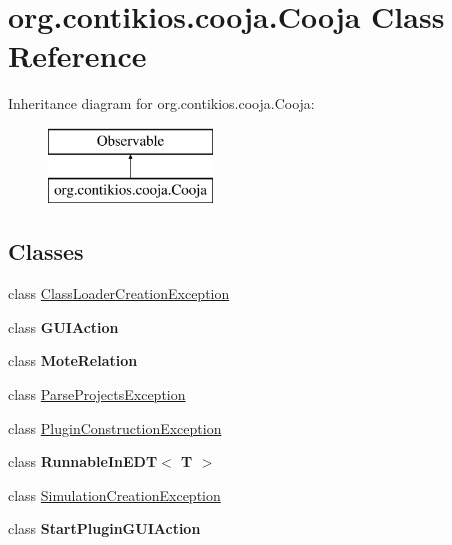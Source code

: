\hypertarget{classorg_1_1contikios_1_1cooja_1_1Cooja}{\section{org.\-contikios.\-cooja.\-Cooja Class Reference}
\label{classorg_1_1contikios_1_1cooja_1_1Cooja}
}
Inheritance diagram for org.\-contikios.\-cooja.\-Cooja\-:\begin{figure}[H]
\begin{center}
\leavevmode
\includegraphics[height=2.000000cm]{classorg_1_1contikios_1_1cooja_1_1Cooja}
\end{center}
\end{figure}
\subsection*{Classes}
\begin{DoxyCompactItemize}
\item 
class \hyperlink{classorg_1_1contikios_1_1cooja_1_1Cooja_1_1ClassLoaderCreationException}{Class\-Loader\-Creation\-Exception}
\item 
class {\bfseries G\-U\-I\-Action}
\item 
class {\bfseries Mote\-Relation}
\item 
class \hyperlink{classorg_1_1contikios_1_1cooja_1_1Cooja_1_1ParseProjectsException}{Parse\-Projects\-Exception}
\item 
class \hyperlink{classorg_1_1contikios_1_1cooja_1_1Cooja_1_1PluginConstructionException}{Plugin\-Construction\-Exception}
\item 
class {\bfseries Runnable\-In\-E\-D\-T$<$ T $>$}
\item 
class \hyperlink{classorg_1_1contikios_1_1cooja_1_1Cooja_1_1SimulationCreationException}{Simulation\-Creation\-Exception}
\item 
class {\bfseries Start\-Plugin\-G\-U\-I\-Action}
\end{DoxyCompactItemize}

